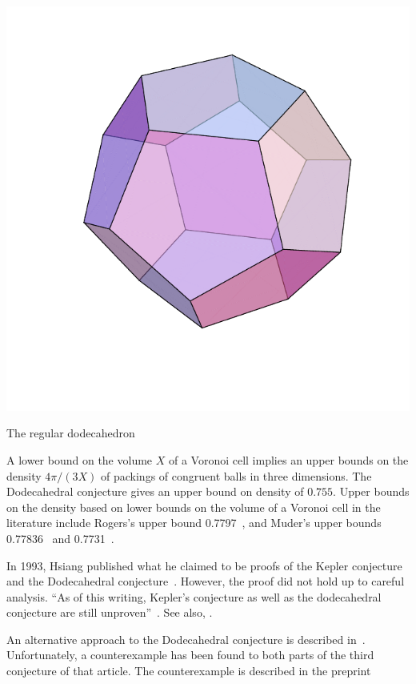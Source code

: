 \documentclass{article} %
\begin{document}
\begin{Figure}[htb]
  \begin{center}
    \includegraphics[scale=0.40]{images/dode.pdf}
   \end{center}
  \caption{The regular dodecahedron}
  \label{fig:dod}
\end{Figure}

A lower bound on the volume $X$ of a Voronoi cell implies
an upper bounds on the density $4\pi/(3X)$ of packings of congruent balls
in three dimensions. The Dodecahedral conjecture gives an upper
bound on density of $0.755$.  
Upper bounds on the density based on lower bounds on the volume of a Voronoi cell
in the literature include Rogers's upper bound 0.7797~\cite{Rogers:1958:Packing}, and Muder's upper 
bounds 0.77836~\cite{Muder:1988:Voronoi} and 0.7731~\cite{Muder:1993:Bound}.

In 1993, Hsiang published what he claimed to be proofs of the Kepler
conjecture and the Dodecahedral conjecture~\cite{Hsiang:1993:IJM}.
However, the proof did not hold up to careful analysis.  ``As of this
writing, Kepler's conjecture as well as the dodecahedral conjecture
are still unproven''~\cite[p761]{Bezdek:1997:IJM}.  See also, \cite{Hales:1994:MI}.

An alternative approach to the Dodecahedral conjecture is described
in~\cite{Bezdek:1997:IJM}.  Unfortunately, a counterexample has been found to
both parts of the third conjecture of that article.  The counterexample
is described in the preprint~\cite{Hales:2002:Dodec}
\end{document}
